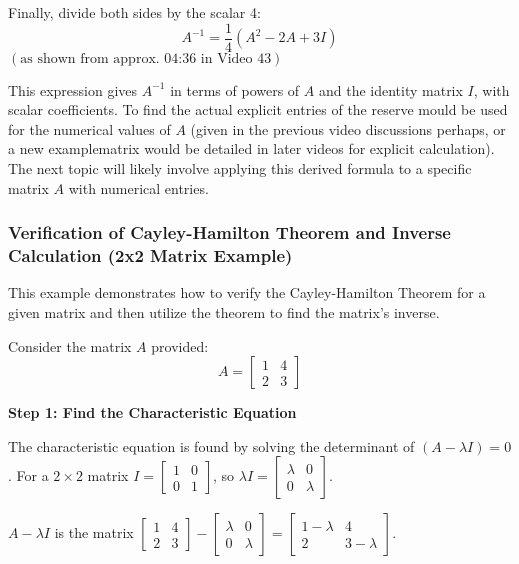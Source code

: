 \documentclass{article}
\begin{document}
Finally, divide both sides by the scalar 4:
\[ A^{-1} = \frac{1}{4} (A^2 - 2A + 3I) \]
$(\text{as shown from approx. 04:36 in Video 43})$

This expression gives $A^{-1}$ in terms of powers of $A$ and the identity matrix $I$, with scalar coefficients. To find the actual explicit entries of the reserve mould be used for the numerical values of $A$ (given in the previous video discussions perhaps, or a new examplematrix would be detailed in later videos for explicit calculation). The next topic will likely involve applying this derived formula to a specific matrix $A$ with numerical entries.


\subsubsection{Verification of Cayley-Hamilton Theorem and Inverse Calculation (2x2 Matrix Example)}

This example demonstrates how to verify the Cayley-Hamilton Theorem for a given matrix and then utilize the theorem to find the matrix's inverse.

Consider the matrix $A$ provided:
\[ A = \begin{bmatrix} 1 & 4 \\ 2 & 3 \end{bmatrix} \]

\textbf{Step 1: Find the Characteristic Equation}

The characteristic equation is found by solving the determinant of $(A - \lambda I) = 0$. For a $2 \times 2$ matrix $I = \begin{bmatrix} 1 & 0 \\ 0 & 1 \end{bmatrix}$, so $\lambda I = \begin{bmatrix} \lambda & 0 \\ 0 & \lambda \end{bmatrix}$.

$A - \lambda I$ is the matrix $\begin{bmatrix} 1 & 4 \\ 2 & 3 \end{bmatrix} - \begin{bmatrix} \lambda & 0 \\ 0 & \lambda \end{bmatrix} = \begin{bmatrix} 1 - \lambda & 4 \\ 2 & 3 - \lambda \end{bmatrix}$.
\end{document}
